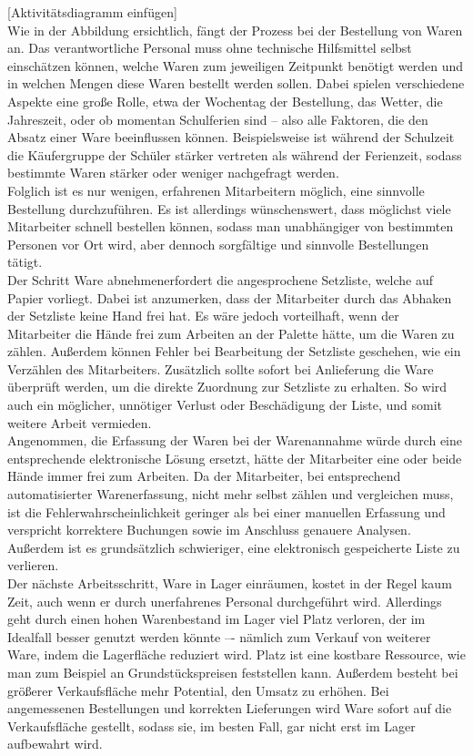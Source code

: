 [Aktivitätsdiagramm einfügen]\\

Wie in der Abbildung ersichtlich, fängt der Prozess bei der Bestellung von Waren an. Das verantwortliche Personal muss ohne technische Hilfsmittel selbst einschätzen können, welche Waren zum jeweiligen Zeitpunkt benötigt werden und in welchen Mengen diese Waren bestellt werden sollen. Dabei spielen verschiedene Aspekte eine große Rolle, etwa der Wochentag der Bestellung, das Wetter, die Jahreszeit, oder ob momentan Schulferien sind -- also alle Faktoren, die den Absatz einer Ware beeinflussen können. Beispielsweise ist während der Schulzeit die Käufergruppe der Schüler stärker vertreten als während der Ferienzeit, sodass bestimmte Waren stärker oder weniger nachgefragt werden.\\
Folglich ist es nur wenigen, erfahrenen Mitarbeitern möglich, eine sinnvolle Bestellung durchzuführen. Es ist allerdings wünschenswert, dass möglichst viele Mitarbeiter schnell bestellen können, sodass man unabhängiger von bestimmten Personen vor Ort wird, aber dennoch sorgfältige und sinnvolle Bestellungen tätigt.\\

Der Schritt \glqq Ware abnehmen\grqq erfordert die angesprochene Setzliste, welche auf Papier vorliegt. Dabei ist anzumerken, dass der Mitarbeiter durch das Abhaken der Setzliste keine Hand frei hat. Es wäre jedoch vorteilhaft, wenn der Mitarbeiter die Hände frei zum Arbeiten an der Palette hätte, um die Waren zu zählen. Außerdem können Fehler bei Bearbeitung der Setzliste geschehen, wie \zB ein Verzählen des Mitarbeiters. Zusätzlich sollte sofort bei Anlieferung die Ware überprüft werden, um die direkte Zuordnung zur Setzliste zu erhalten. So wird auch ein möglicher, unnötiger Verlust oder Beschädigung der Liste, und somit weitere Arbeit vermieden.\\
Angenommen, die Erfassung der Waren bei der Warenannahme würde durch eine entsprechende elektronische Lösung ersetzt, hätte der Mitarbeiter eine oder beide Hände immer frei zum Arbeiten. Da der Mitarbeiter, bei entsprechend automatisierter Warenerfassung, nicht mehr selbst zählen und vergleichen muss, ist die Fehlerwahrscheinlichkeit geringer als bei einer manuellen Erfassung und verspricht korrektere Buchungen sowie im Anschluss genauere Analysen. Außerdem ist es grundsätzlich schwieriger, eine elektronisch gespeicherte Liste zu verlieren.\\

Der nächste Arbeitsschritt, \glqq Ware in Lager einräumen\grqq , kostet in der Regel kaum Zeit, auch wenn er durch unerfahrenes Personal durchgeführt wird. Allerdings geht durch einen hohen Warenbestand im Lager viel Platz verloren, der im Idealfall besser genutzt werden könnte –- nämlich zum Verkauf von weiterer Ware, indem die Lagerfläche reduziert wird. Platz ist eine kostbare Ressource, wie man zum Beispiel an Grundstückspreisen feststellen kann. Außerdem besteht bei größerer Verkaufsfläche mehr Potential, den Umsatz zu erhöhen. Bei angemessenen Bestellungen und korrekten Lieferungen wird Ware sofort auf die Verkaufsfläche gestellt, sodass sie, im besten Fall, gar nicht erst im Lager aufbewahrt wird.\\

